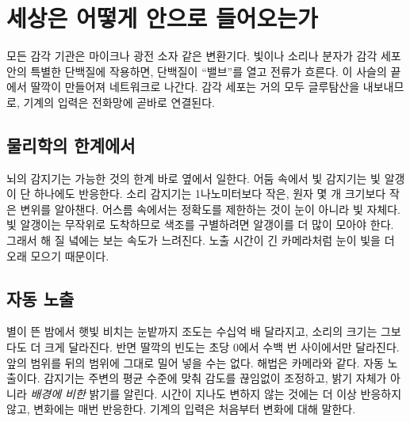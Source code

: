 \chapter{세상은 어떻게 안으로 들어오는가}

모든 감각 기관은 마이크나 광전 소자 같은 변환기다. 빛이나 소리나 분자가 감각 세포 안의 특별한 단백질에 작용하면, 단백질이 “밸브”를 열고 전류가 흐른다. 이 사슬의 끝에서 딸깍이 만들어져 네트워크로 나간다. 감각 세포는 거의 모두 글루탐산을 내보내므로, 기계의 입력은 전화망에 곧바로 연결된다.

\section*{물리학의 한계에서}

뇌의 감지기는 가능한 것의 한계 바로 옆에서 일한다. 어둠 속에서 빛 감지기는 빛 알갱이 단 하나에도 반응한다. 소리 감지기는 1나노미터보다 작은, 원자 몇 개 크기보다 작은 변위를 알아챈다. 어스름 속에서는 정확도를 제한하는 것이 눈이 아니라 빛 자체다. 빛 알갱이는 무작위로 도착하므로 색조를 구별하려면 알갱이를 더 많이 모아야 한다. 그래서 해 질 녘에는 보는 속도가 느려진다. 노출 시간이 긴 카메라처럼 눈이 빛을 더 오래 모으기 때문이다.

\section*{자동 노출}

별이 뜬 밤에서 햇빛 비치는 눈밭까지 조도는 수십억 배 달라지고, 소리의 크기는 그보다도 더 크게 달라진다. 반면 딸깍의 빈도는 초당 0에서 수백 번 사이에서만 달라진다. 앞의 범위를 뒤의 범위에 그대로 밀어 넣을 수는 없다. 해법은 카메라와 같다. 자동 노출이다. 감지기는 주변의 평균 수준에 맞춰 감도를 끊임없이 조정하고, 밝기 자체가 아니라 \emph{배경에 비한} 밝기를 알린다. 시간이 지나도 변하지 않는 것에는 더 이상 반응하지 않고, 변화에는 매번 반응한다. 기계의 입력은 처음부터 변화에 대해 말한다.


